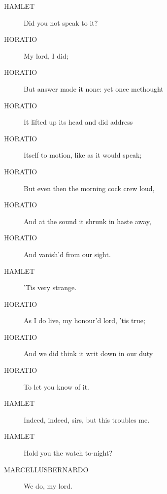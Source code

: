 \documentclass{article}
\begin{document}
\begin{description}
            
\item[HAMLET] Did you not speak to it?
\end{description}
          
\begin{description}
            
\item[HORATIO] My lord, I did;
\item[HORATIO] But answer made it none: yet once methought
\item[HORATIO] It lifted up its head and did address
\item[HORATIO] Itself to motion, like as it would speak;
\item[HORATIO] But even then the morning cock crew loud,
\item[HORATIO] And at the sound it shrunk in haste away,
\item[HORATIO] And vanish'd from our sight.
\end{description}
          
\begin{description}
            
\item[HAMLET] 'Tis very strange.
\end{description}
          
\begin{description}
            
\item[HORATIO] As I do live, my honour'd lord, 'tis true;
\item[HORATIO] And we did think it writ down in our duty
\item[HORATIO] To let you know of it.
\end{description}
          
\begin{description}
            
\item[HAMLET] Indeed, indeed, sirs, but this troubles me.
\item[HAMLET] Hold you the watch to-night?
\end{description}
          
\begin{description}
            
\item[MARCELLUSBERNARDO] We do, my lord.
\end{description}
          
\end{document}
